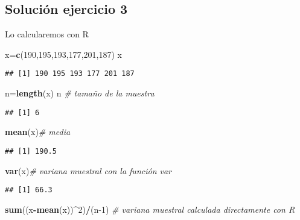 \documentclass[
]{article}
\newenvironment{Shaded}{\begin{snugshade}}{\end{snugshade}}
\newcommand{\CommentTok}[1]{\textcolor[rgb]{0.56,0.35,0.01}{\textit{#1}}}
\newcommand{\DecValTok}[1]{\textcolor[rgb]{0.00,0.00,0.81}{#1}}
\newcommand{\KeywordTok}[1]{\textcolor[rgb]{0.13,0.29,0.53}{\textbf{#1}}}
\newcommand{\NormalTok}[1]{#1}
\newcommand{\OperatorTok}[1]{\textcolor[rgb]{0.81,0.36,0.00}{\textbf{#1}}}
\begin{document}
\hypertarget{soluciuxf3n-ejercicio-3}{%
\subsection{Solución ejercicio 3}\label{soluciuxf3n-ejercicio-3}}

Lo calcularemos con R

\begin{Shaded}
\begin{Highlighting}[]
\NormalTok{x=}\KeywordTok{c}\NormalTok{(}\DecValTok{190}\NormalTok{,}\DecValTok{195}\NormalTok{,}\DecValTok{193}\NormalTok{,}\DecValTok{177}\NormalTok{,}\DecValTok{201}\NormalTok{,}\DecValTok{187}\NormalTok{)}
\NormalTok{x}
\end{Highlighting}
\end{Shaded}

\begin{verbatim}
## [1] 190 195 193 177 201 187
\end{verbatim}

\begin{Shaded}
\begin{Highlighting}[]
\NormalTok{n=}\KeywordTok{length}\NormalTok{(x)}
\NormalTok{n }\CommentTok{\# tamaño de la muestra}
\end{Highlighting}
\end{Shaded}

\begin{verbatim}
## [1] 6
\end{verbatim}

\begin{Shaded}
\begin{Highlighting}[]
\KeywordTok{mean}\NormalTok{(x)}\CommentTok{\# media}
\end{Highlighting}
\end{Shaded}

\begin{verbatim}
## [1] 190.5
\end{verbatim}

\begin{Shaded}
\begin{Highlighting}[]
\KeywordTok{var}\NormalTok{(x)}\CommentTok{\# variana muestral con la función var}
\end{Highlighting}
\end{Shaded}

\begin{verbatim}
## [1] 66.3
\end{verbatim}

\begin{Shaded}
\begin{Highlighting}[]
\KeywordTok{sum}\NormalTok{((x}\OperatorTok{{-}}\KeywordTok{mean}\NormalTok{(x))}\OperatorTok{\^{}}\DecValTok{2}\NormalTok{)}\OperatorTok{/}\NormalTok{(n}\DecValTok{{-}1}\NormalTok{) }\CommentTok{\# variana muestral calculada directamente con R}
\end{Highlighting}
\end{Shaded}
\end{document}
